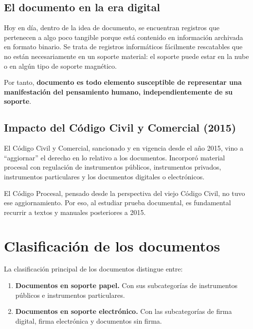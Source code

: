 \documentclass[12pt,oneside]{book}
\begin{document}
\section{El documento en la era digital}

Hoy en día, dentro de la idea de documento, se encuentran registros que pertenecen a algo poco tangible porque está contenido en información archivada en formato binario. Se trata de registros informáticos fácilmente rescatables que no están necesariamente en un soporte material: el soporte puede estar en la nube o en algún tipo de soporte magnético.

Por tanto, \textbf{documento es todo elemento susceptible de representar una manifestación del pensamiento humano, independientemente de su soporte}.

\section{Impacto del Código Civil y Comercial (2015)}

El Código Civil y Comercial, sancionado y en vigencia desde el año 2015, vino a ``aggiornar'' el derecho en lo relativo a los documentos. Incorporó material procesal con regulación de instrumentos públicos, instrumentos privados, instrumentos particulares y los documentos digitales o electrónicos.

\begin{important}
El Código Procesal, pensado desde la perspectiva del viejo Código Civil, no tuvo ese aggiornamiento. Por eso, al estudiar prueba documental, es fundamental recurrir a textos y manuales posteriores a 2015.
\end{important}

\chapter{Clasificación de los documentos}

La clasificación principal de los documentos distingue entre:

\begin{enumerate}[label=\alph*)]
    \item \textbf{Documentos en soporte papel.} Con sus subcategorías de instrumentos públicos e instrumentos particulares.
    \item \textbf{Documentos en soporte electrónico.} Con las subcategorías de firma digital, firma electrónica y documentos sin firma.
\end{enumerate}
\end{document}
